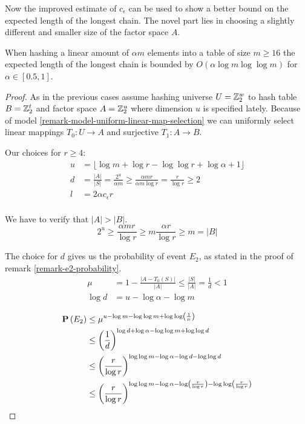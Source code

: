 Now the improved estimate of $c_\epsilon$ can be used to show a better bound on the expected length of the longest chain. The novel part lies in choosing a slightly different and smaller size of the factor space $A$.
\begin{theorem}
\label{theorem-hashing-linear-amount}
When hashing a linear amount of $\alpha m$ elements into a table of size $m \geq 16$ the expected length of the longest chain is bounded by $O(\alpha \log m \log \log m)$ for $\alpha \in \left[0.5, 1 \right]$.
\end{theorem}
\begin{proof}
As in the previous cases assume hashing universe $U = \mathbb{Z}_{2}^{w}$ to hash table $B = \mathbb{Z}_{2}^{t}$ and factor space $A = \mathbb{Z}_{2}^{u}$ where dimension $u$ is specified lately. Because of model \ref{remark-model-uniform-linear-map-selection} we can uniformly select linear mappings $T_0: U \rightarrow A$ and surjective $T_1: A \rightarrow B$.

Our choices for $r \geq 4$:
\[
\begin{split}
u & = \lfloor \log m + \log r - \log \log r + \log \alpha + 1\rfloor \\
d & = \frac{|A|}{|S|} = \frac{2 ^ u}{\alpha m} \geq \frac{\alpha m r}{\alpha m \log r} = \frac{r}{\log r} \geq 2 \\
l & = 2 \alpha c_\epsilon r \\
\end{split}
\]

We have to verify that $|A| > |B|$.
\[
2 ^ u \geq \frac{\alpha m r }{\log r} \geq m \frac{\alpha r}{\log r} \geq m = |B|
\]

The choice for $d$ gives us the probability of event $E_2$, as stated in the proof of remark \ref{remark-e2-probability}.
\[
\begin{split}
\mu & = 1 - \frac{|A - T_0(S)|}{|A|} \leq \frac{|S|}{|A|} = \frac{1}{d} < 1 \\
\log d & = u - \log \alpha - \log m
\end{split}
\]

\[
\begin{split}
\mathbf{P}\left(E_2\right)
	& \leq \mu ^ {u - \log m - \log \log m + \log \log \left( \frac{1}{\mu} \right)} \\
	& \leq \left(\frac{1}{d}\right) ^ {\log d + \log \alpha - \log \log m + \log \log d} \\
	& \leq \left(\frac{r}{\log r}\right) ^ {\log \log m - \log \alpha - \log d - \log \log d} \\
	& \leq \left(\frac{r}{\log r}\right) ^ {\log \log m - \log \alpha - \log \left(\frac{r}{\log r}\right) - \log \log \left(\frac{r}{\log r}\right)} \\
\end{split}
\]


\end{proof}
